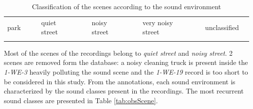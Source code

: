 \documentclass[11pt,letter]{article}
\begin{document}
\begin{table}[h]
\begin{tabular}{|p{1cm}|l|p{0.001cm}|p{2cm}|l|p{0.001cm}|p{2cm}|l|p{0.001cm}|p{2.75cm}|l|p{0.001cm}|p{2cm}|l|}

\hhline{|-|-|~|-|-|~|-|-|~|-|-|~|-|-|}
park & {\cellcolor[HTML]{5AB25A}} & & quiet street & {\cellcolor[HTML]{FFCB2F}} & & noisy street & {\cellcolor[HTML]{F56B00}} & &  very noisy street & {\cellcolor[HTML]{9A0000}} & & unclassified & \\
\hhline{|-|-|~|-|-|~|-|-|~|-|-|~|-|-|}

\end{tabular}

\caption{Classification of the scenes according to the sound environment}
\label{tab:classificationScene}
\end{table}

Most of the scenes of the recordings belong to \textit{quiet street} and \textit{noisy street}. 2 scenes are removed form the database: a noisy cleaning truck is present inside the \textit{1-WE-3} heavily polluting the sound scene and the \textit{1-WE-19} record is too short to be considered in this study. From the annotations, each sound environment is characterized by the sound classes present in the recordings. The most recurrent sound classes are presented in Table \ref{tab:obsScene}.\\
\end{document}
